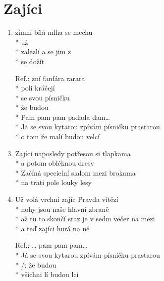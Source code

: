 \section{Zajíci}
\begin{enumerate}
\item {}zimní bílá mlha  se  mechu \\*
  už  \\*
 zalezli a  se jim z  \\*
 se dožít  
\item[Ref.:]  zní fanfára  rarara \\*
 poli kráčejí   \\*
 se svou   písničku  \\*
 že  budou  \\*
Pam pam pam padada dam… \\*
Já se svou kytarou zpívám písničku prastarou \\*
o tom že malí budou velcí 
\item Zajíci naposledy potřesou si tlapkama \\*
a potom obléknou dresy \\*
Začíná specielní slalom mezi brokama \\*
na trati pole louky lesy 
\item Už volá vrchní zajíc Pravda vítězí \\*
nohy jsou naše hlavní zbraně \\*
až tu to skončí sraz je v sedm večer na mezi \\*
a teď zajíci hurá na ně 
\item[Ref.:] … pam pam pam… \\*
Já se svou kytarou zpívám písničku prastarou \\*
/:  že  budou   \\*
 všichni lí budou lcí 
\end{enumerate}
